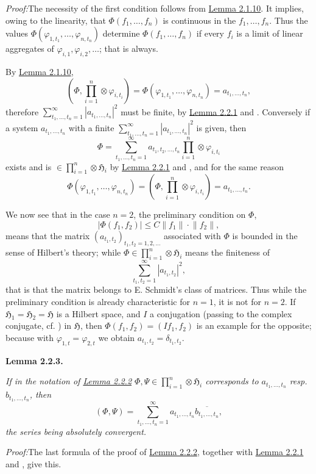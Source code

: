 \documentclass[12pt,b5paper,twoside]{article}
\newcommand{\Hspace}{\mathfrak H}
\newcommand{\Lemma}[1]{%
  \par\smallskip\noindent\phantomsection\label{lem:#1}\textbf{Lemma #1.}\enspace
}
\newcommand{\Proof}{\par\noindent\textit{Proof:}\enspace}
\newcommand{\lemref}[1]{\hyperref[lem:#1]{Lemma #1}}
\begin{document}
\Proof The necessity of the first condition follows from \lemref{2.1.10}. It
implies, owing to the linearity, that $\Phi(f_1,\ldots,f_n)$ is continuous in
the $f_1,\ldots,f_n$. Thus the values
$\Phi(\varphi_{1,t_1},\ldots,\varphi_{n,t_n})$ determine
$\Phi(f_1,\ldots,f_n)$ if every $f_i$ is a limit of linear aggregates of
$\varphi_{i,1},\varphi_{i,2},\ldots$; that is always.

By \lemref{2.1.10},
\[
 \left(\Phi,\prod_{i=1}^{n}\otimes\varphi_{i,t_i}\right)
 =\Phi(\varphi_{1,t_1},\ldots,\varphi_{n,t_n})=a_{t_1,\ldots,t_n},
\]
therefore
$\sum_{t_1,\ldots,t_n=1}^{\infty}|a_{t_1,\ldots,t_n}|^2$ must be finite, by
\lemref{2.2.1} and \cite[p.~66]{ref16}. Conversely if a system
$a_{t_1,\ldots,t_n}$ with a finite
$\sum_{t_1,\ldots,t_n=1}^{\infty}|a_{t_1,\ldots,t_n}|^2$ is given, then
\[
 \Phi=\sum_{t_1,\ldots,t_n=1}^{\infty}a_{t_1,t_2,\ldots,t_n}
       \prod_{i=1}^{n}\otimes\varphi_{i,t_i}
\]
exists and is $\in\prod_{i=1}^{n}\otimes\Hspace_i$ by \lemref{2.2.1} and
\cite[p.~67]{ref16}, and for the same reason
\[
 \Phi(\varphi_{1,t_1},\ldots,\varphi_{n,t_n})
 =\left(\Phi,\prod_{i=1}^{n}\otimes\varphi_{i,t_i}\right)
 =a_{t_1,\ldots,t_n}.
\]

We now see that in the case $n=2$, the preliminary condition on $\Phi$,
\[
 |\Phi(f_1,f_2)|\leq C\lVert f_1\rVert\cdot\lVert f_2\rVert,
\]
means that the matrix
$(a_{t_1,t_2})_{t_1,t_2=1,2,\ldots}$ associated with $\Phi$ is bounded in the
sense of Hilbert's theory; while
$\Phi\in\prod_{i=1}^{n}\otimes\Hspace_i$ means the finiteness of
\[
 \sum_{t_1,t_2=1}^{\infty}|a_{t_1,t_2}|^2,
\]
that is that the matrix belongs to E. Schmidt's class of matrices. Thus while
the preliminary condition is already characteristic for $n=1$, it is not for
$n=2$. If $\Hspace_1=\Hspace_2=\Hspace$ is a Hilbert space, and $I$ a
conjugation (passing to the complex conjugate, cf. \cite[p.~357]{ref15}) in
$\Hspace$, then $\Phi(f_1,f_2)=(If_1,f_2)$ is an example for the opposite;
because with $\varphi_{1,t}=\varphi_{2,t}$ we obtain
$a_{t_1,t_2}=\delta_{t_1,t_2}$.

\Lemma{2.2.3}
{\itshape
If in the notation of \lemref{2.2.2}
$\Phi,\Psi\in\prod_{i=1}^{n}\otimes\Hspace_i$ corresponds to
$a_{t_1,\ldots,t_n}$ resp. $b_{t_1,\ldots,t_n}$, then
\[
 (\Phi,\Psi)=\sum_{t_1,\ldots,t_n=1}^{\infty}
 a_{t_1,\ldots,t_n}\overline{b_{t_1,\ldots,t_n}},
\]
the series being absolutely convergent.}

\Proof The last formula of the proof of \lemref{2.2.2}, together with
\lemref{2.2.1} and \cite[p.~66]{ref16}, give this.
\end{document}
